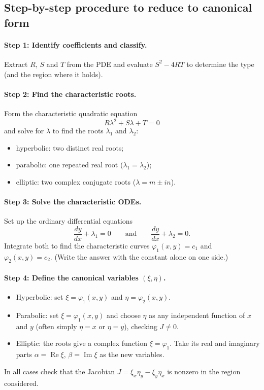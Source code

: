 \documentclass[11pt]{article}
\theoremstyle{plain}
\theoremstyle{definition}
\theoremstyle{remark}
\begin{document}
\subsection{Step-by-step procedure to reduce to canonical form}

\paragraph{Step 1: Identify coefficients and classify.} Extract $R$, $S$ and $T$ from the PDE and evaluate $S^2 - 4RT$ to determine the type (and the region where it holds).

\paragraph{Step 2: Find the characteristic roots.} Form the characteristic quadratic equation
$$ R\lambda^2 + S\lambda + T = 0 $$
and solve for $\lambda$ to find the roots $\lambda_1$ and $\lambda_2$:
\begin{itemize}
    \item hyperbolic: two distinct real roots;
    \item parabolic: one repeated real root ($\lambda_1 = \lambda_2$);
    \item elliptic: two complex conjugate roots ($\lambda = m \pm in$).
\end{itemize}

\paragraph{Step 3: Solve the characteristic ODEs.} Set up the ordinary differential equations
$$ \frac{dy}{dx} + \lambda_1 = 0 \qquad\text{and}\qquad \frac{dy}{dx} + \lambda_2 = 0. $$
Integrate both to find the characteristic curves $\varphi_1(x,y) = c_1$ and $\varphi_2(x,y) = c_2$. (Write the answer with the constant alone on one side.)

\paragraph{Step 4: Define the canonical variables $(\xi,\eta)$.}
\begin{itemize}
    \item Hyperbolic: set $\xi = \varphi_1(x,y)$ and $\eta = \varphi_2(x,y)$.
    \item Parabolic: set $\xi = \varphi_1(x,y)$ and choose $\eta$ as any independent function of $x$ and $y$ (often simply $\eta = x$ or $\eta = y$), checking $J \ne 0$.
    \item Elliptic: the roots give a complex function $\xi = \varphi_1$. Take its real and imaginary parts $\alpha = \operatorname{Re}\xi$, $\beta = \operatorname{Im}\xi$ as the new variables.
\end{itemize}
In all cases check that the Jacobian $J = \xi_x\eta_y - \xi_y\eta_x$ is nonzero in the region considered.
\end{document}

